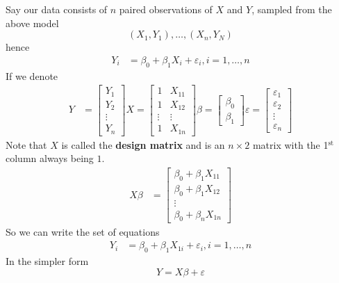 \documentclass[12 pt]{article}
\begin{document}
Say our data consists of $n$ paired observations of $X$ and $Y$,
sampled from the above model
$$(X_1, Y_1), \ldots, (X_n, Y_N)$$
hence
\begin{align*}
  Y_i &= \beta_0 + \beta_1 X_i + \varepsilon_i, i = 1, \ldots, n
\end{align*}
If we denote
\begin{align*}
  Y & =
      \begin{bmatrix}
        Y_1 \\ Y_2 \\ \vdots \\ Y_n
      \end{bmatrix} X =
  \begin{bmatrix}
    1 & X_{11}\\ 1& X_{12} \\ \vdots &\vdots \\ 1 & X_{1n}
  \end{bmatrix}
                                                    \beta =
                                                    \begin{bmatrix}
                                                      \beta_0 \\ \beta_1
                                                    \end{bmatrix}
\varepsilon =
  \begin{bmatrix}
    \varepsilon_1 \\ \varepsilon_2 \\ \vdots \\ \varepsilon_n
  \end{bmatrix}
\end{align*}
Note that $X$ is called the \textbf{design matrix} and is an $n \times
2$ matrix with the 1$^{\text{st}}$ column always being $1$.
\begin{align*}
  X\beta & =
           \begin{bmatrix}
             \beta_0 + \beta_1 X_{11}
             \\ \beta_0 + \beta_1 X_{12}
             \\ \vdots
             \\ \beta_0 + \beta_n X_{1n}
           \end{bmatrix}
\end{align*}
So we can write the set of equations
\begin{align*}
  Y_i & = \beta_0 + \beta_1X_{1i} + \varepsilon_i, i=1, \ldots, n
\end{align*}
In the simpler form
$$Y = X\beta + \varepsilon$$
\end{document}
